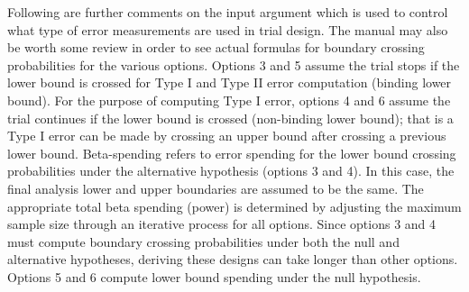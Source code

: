 \begin{Details}
Following are further comments on the input argument  which is used to control what type of error measurements are used in trial design.
The manual may also be worth some review in order to see actual formulas for boundary crossing probabilities for the various options. 
Options 3 and 5 assume the trial stops if the lower bound is crossed for Type I and Type II error computation (binding lower bound). 
For the purpose of computing Type I error, options 4 and 6 assume the trial continues if the lower bound is crossed (non-binding lower bound); that is a Type I error can be made by crossing an upper bound after crossing a previous lower bound. 
Beta-spending refers to error spending for the lower bound crossing probabilities
under the alternative hypothesis (options 3 and 4).
In this case, the final analysis lower and upper boundaries are assumed to be the same.
The appropriate total beta spending (power) is determined by adjusting the maximum sample size
through an iterative process for all options.
Since options 3 and 4 must compute boundary crossing probabilities under both the null and alternative hypotheses,
deriving these designs can take longer than other options.
Options 5 and 6 compute lower bound spending under the null hypothesis.
\end{Details}
